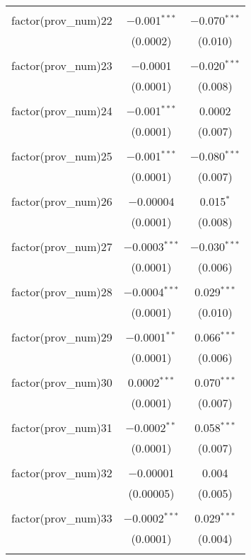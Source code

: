 \begin{table}[ht!]
\begin{tabular}{@{\extracolsep{5pt}}lcc}
  & & \\ 
 factor(prov\_num)22 & $-$0.001$^{***}$ & $-$0.070$^{***}$ \\ 
  & (0.0002) & (0.010) \\ 
  & & \\ 
 factor(prov\_num)23 & $-$0.0001 & $-$0.020$^{***}$ \\ 
  & (0.0001) & (0.008) \\ 
  & & \\ 
 factor(prov\_num)24 & $-$0.001$^{***}$ & 0.0002 \\ 
  & (0.0001) & (0.007) \\ 
  & & \\ 
 factor(prov\_num)25 & $-$0.001$^{***}$ & $-$0.080$^{***}$ \\ 
  & (0.0001) & (0.007) \\ 
  & & \\ 
 factor(prov\_num)26 & $-$0.00004 & 0.015$^{*}$ \\ 
  & (0.0001) & (0.008) \\ 
  & & \\ 
 factor(prov\_num)27 & $-$0.0003$^{***}$ & $-$0.030$^{***}$ \\ 
  & (0.0001) & (0.006) \\ 
  & & \\ 
 factor(prov\_num)28 & $-$0.0004$^{***}$ & 0.029$^{***}$ \\ 
  & (0.0001) & (0.010) \\ 
  & & \\ 
 factor(prov\_num)29 & $-$0.0001$^{**}$ & 0.066$^{***}$ \\ 
  & (0.0001) & (0.006) \\ 
  & & \\ 
 factor(prov\_num)30 & 0.0002$^{***}$ & 0.070$^{***}$ \\ 
  & (0.0001) & (0.007) \\ 
  & & \\ 
 factor(prov\_num)31 & $-$0.0002$^{**}$ & 0.058$^{***}$ \\ 
  & (0.0001) & (0.007) \\ 
  & & \\ 
 factor(prov\_num)32 & $-$0.00001 & 0.004 \\ 
  & (0.00005) & (0.005) \\ 
  & & \\ 
 factor(prov\_num)33 & $-$0.0002$^{***}$ & 0.029$^{***}$ \\ 
  & (0.0001) & (0.004) \\ 
  & & \\ 

\end{tabular}
\end{table}
